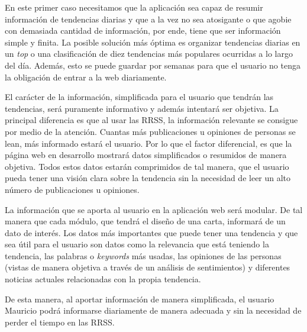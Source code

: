 En este primer caso necesitamos que la aplicación sea capaz de resumir información de tendencias diarias y que a la vez no sea atosigante o que agobie con demasiada cantidad de información, por ende, tiene que ser información simple y finita. La posible solución más óptima es organizar tendencias diarias en un \textit{top} o una clasificación de diez tendencias más populares ocurridas a lo largo del día. Además, esto se puede guardar por semanas para que el usuario no tenga la obligación de entrar a la web diariamente.

\vspace{0.3cm}

El carácter de la información, simplificada para el usuario que tendrán las tendencias, será puramente informativo y además intentará ser objetiva. La principal diferencia es que al usar las \ac{RRSS}, la información relevante se consigue por medio de la atención. Cuantas más publicaciones u opiniones de personas se lean, más informado estará el usuario. Por lo que el factor diferencial, es que la página web en desarrollo mostrará datos simplificados o resumidos de manera objetiva. Todos estos datos estarán comprimidos de tal manera, que el usuario pueda tener una visión clara sobre la tendencia sin la necesidad de leer un alto número de publicaciones u opiniones.

\vspace{0.3cm}

La información que se aporta al usuario en la aplicación web será modular. De tal manera que cada módulo, que tendrá el diseño de una carta, informará de un dato de interés. Los datos más importantes que puede tener una tendencia y que sea útil para el usuario son datos como la relevancia que está teniendo la tendencia, las palabras o \textit{keywords} más usadas, las opiniones de las personas (vistas de manera objetiva a través de un análisis de sentimientos) y diferentes noticias actuales relacionadas con la propia tendencia.

\vspace{0.3cm}

De esta manera, al aportar información de manera simplificada, el usuario Mauricio podrá informarse diariamente de manera adecuada y sin la necesidad de perder el tiempo en las \ac{RRSS}.


